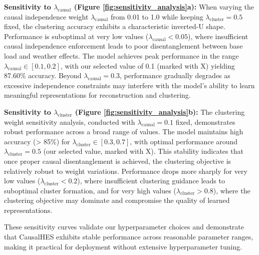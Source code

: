 \documentclass[journal]{IEEEtran}
\begin{document}
\textbf{Sensitivity to $\lambda_{\text{causal}}$ (Figure \ref{fig:sensitivity_analysis}a):} When varying the causal independence weight $\lambda_{\text{causal}}$ from 0.01 to 1.0 while keeping $\lambda_{\text{cluster}}=0.5$ fixed, the clustering accuracy exhibits a characteristic inverted-U shape. Performance is suboptimal at very low values ($\lambda_{\text{causal}} < 0.05$), where insufficient causal independence enforcement leads to poor disentanglement between base load and weather effects. The model achieves peak performance in the range $\lambda_{\text{causal}} \in [0.1, 0.2]$, with our selected value of 0.1 (marked with X) yielding 87.60\% accuracy. Beyond $\lambda_{\text{causal}} = 0.3$, performance gradually degrades as excessive independence constraints may interfere with the model's ability to learn meaningful representations for reconstruction and clustering.

\textbf{Sensitivity to $\lambda_{\text{cluster}}$ (Figure \ref{fig:sensitivity_analysis}b):} The clustering weight sensitivity analysis, conducted with $\lambda_{\text{causal}}=0.1$ fixed, demonstrates robust performance across a broad range of values. The model maintains high accuracy (> 85\%) for $\lambda_{\text{cluster}} \in [0.3, 0.7]$, with optimal performance around $\lambda_{\text{cluster}} = 0.5$ (our selected value, marked with X). This stability indicates that once proper causal disentanglement is achieved, the clustering objective is relatively robust to weight variations. Performance drops more sharply for very low values ($\lambda_{\text{cluster}} < 0.2$), where insufficient clustering guidance leads to suboptimal cluster formation, and for very high values ($\lambda_{\text{cluster}} > 0.8$), where the clustering objective may dominate and compromise the quality of learned representations.

These sensitivity curves validate our hyperparameter choices and demonstrate that CausalHES exhibits stable performance across reasonable parameter ranges, making it practical for deployment without extensive hyperparameter tuning.
\end{document}
